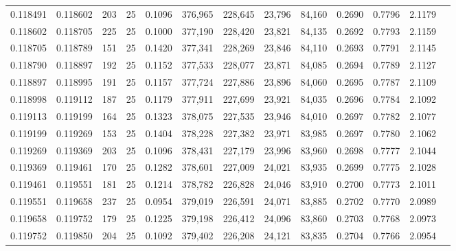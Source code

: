 \begin{tabular}{rrrrrrrrrrrrr}
0.118491 & 0.118602 &   203 &  25 &                                     0.1096 & 376,965 & 228,645 &  23,796 &  84,160 & 0.2690 & 0.7796 & 2.1179 \\
0.118602 & 0.118705 &   225 &  25 &                                     0.1000 & 377,190 & 228,420 &  23,821 &  84,135 & 0.2692 & 0.7793 & 2.1159 \\
0.118705 & 0.118789 &   151 &  25 &                                     0.1420 & 377,341 & 228,269 &  23,846 &  84,110 & 0.2693 & 0.7791 & 2.1145 \\
0.118790 & 0.118897 &   192 &  25 &                                     0.1152 & 377,533 & 228,077 &  23,871 &  84,085 & 0.2694 & 0.7789 & 2.1127 \\
0.118897 & 0.118995 &   191 &  25 &                                     0.1157 & 377,724 & 227,886 &  23,896 &  84,060 & 0.2695 & 0.7787 & 2.1109 \\
0.118998 & 0.119112 &   187 &  25 &                                     0.1179 & 377,911 & 227,699 &  23,921 &  84,035 & 0.2696 & 0.7784 & 2.1092 \\
0.119113 & 0.119199 &   164 &  25 &                                     0.1323 & 378,075 & 227,535 &  23,946 &  84,010 & 0.2697 & 0.7782 & 2.1077 \\
0.119199 & 0.119269 &   153 &  25 &                                     0.1404 & 378,228 & 227,382 &  23,971 &  83,985 & 0.2697 & 0.7780 & 2.1062 \\
0.119269 & 0.119369 &   203 &  25 &                                     0.1096 & 378,431 & 227,179 &  23,996 &  83,960 & 0.2698 & 0.7777 & 2.1044 \\
0.119369 & 0.119461 &   170 &  25 &                                     0.1282 & 378,601 & 227,009 &  24,021 &  83,935 & 0.2699 & 0.7775 & 2.1028 \\
0.119461 & 0.119551 &   181 &  25 &                                     0.1214 & 378,782 & 226,828 &  24,046 &  83,910 & 0.2700 & 0.7773 & 2.1011 \\
0.119551 & 0.119658 &   237 &  25 &                                     0.0954 & 379,019 & 226,591 &  24,071 &  83,885 & 0.2702 & 0.7770 & 2.0989 \\
0.119658 & 0.119752 &   179 &  25 &                                     0.1225 & 379,198 & 226,412 &  24,096 &  83,860 & 0.2703 & 0.7768 & 2.0973 \\
0.119752 & 0.119850 &   204 &  25 &                                     0.1092 & 379,402 & 226,208 &  24,121 &  83,835 & 0.2704 & 0.7766 & 2.0954 \\

\end{tabular}
